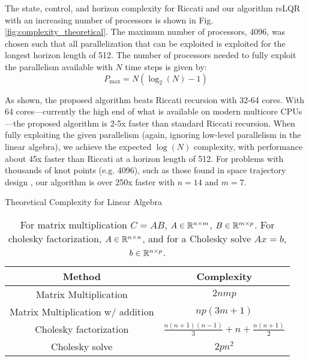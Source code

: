 \documentclass[../root.tex]{subfiles}
\newcommand{\0}{{\transparent{0} \resizebox{\mycellheight}{\mycellheight}{0}}}
\begin{document}
The state, control, and horizon complexity for Riccati and our algorithm rsLQR with an 
increasing number of processors is shown in Fig. \ref{fig:complexity_theoretical}.
The maximum number of processors, 4096, was chosen 
such that all parallelization that can be exploited is exploited for the longest horizon
length of 512. The number of processors needed to fully exploit the parallelism available
with $N$ time steps is given by:
\begin{equation}
    P_\text{max} = N \left(\log_2(N) - 1 \right)
\end{equation}

As shown, the proposed algorithm beats Riccati recursion with 32-64 cores.  With 64
cores---currently the high end of what is available on modern multicore CPUs---the proposed
algorithm is 2-5x faster than standard Riccati recursion. When fully exploiting the given
parallelism (again, ignoring low-level parallelism in the linear algebra), we achieve the
expected $\log(N)$ complexity, with performance about 45x faster than Riccati at a horizon
length of 512. For problems with thousands of knot points (e.g. 4096), such as those found
in space trajectory design \cite{tracy_LowThrust_2021}, our algorithm is over 250x faster 
with $n=14$ and $m=7$. 

\begin{table}
    \caption{Theoretical Complexity for Linear Algebra}
    \begin{tabular}{c c}
        Method & Complexity \\
        \midrule
        Matrix Multiplication & $2nmp$ \\
        Matrix Multiplication w/ addition & $n p (3m+1)$ \\
        Cholesky factorization & $ \frac{n (n+1) (n-1)}{3} + n + \frac{n(n+1)}{2}$ \\
        Cholesky solve & $2pn^2$ \\
    \end{tabular}
    \caption*{\small{For matrix multiplication $C = A B$, $A \in \mathbb{R}^{n \times m}$, $B \in \mathbb{R}^{m \times p}$. 
        For cholesky factorization, $A \in \mathbb{R}^{n \times n}$, and for a Cholesky solve $A x = b$, 
        $b \in \mathbb{R}^{n \times p}$.}}
    \label{tab:linalg_complexity}
\end{table}
\end{document}
